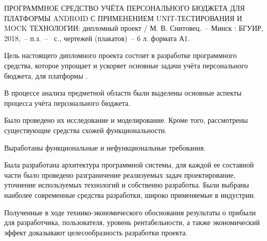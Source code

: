 \thispagestyle{empty}


\MakeUppercase{Программное средство учёта персонального бюджета для платформы Android с применением Unit-\-тес\-ти\-ро\-ва\-ния и Mock технологии}: дипломный проект / М. В. Снитовец.~-- Минск : БГУИР, 2018,~-- п.з.~-- \totalpages~с., чертежей (плакатов)~-- 6 л. формата А1.
\vspace{\baselineskip}

Цель настоящего дипломного проекта состоит в  разработке программного средства, которое упрощает и ускоряет основные задачи учёта персонального бюджета, для платформы \andro.

В процессе анализа предметной области были выделены основные аспекты процесса учёта персонального бюджета.

Было проведено их исследование и моделирование.
Кроме того, рассмотрены существующие средства схожей функциональности.

Выработаны функциональные и нефункциональные требования.

Была разработана архитектура программной системы, для каждой ее составной части было проведено разграничение реализуемых задач проектирование, уточнение используемых технологий и собственно разработка.
Были выбраны наиболее современные средства разработки, широко применяемые в индустрии.

Полученные в ходе технико-экономического обоснования результаты о прибыли для разработчика, пользователя, уровень рентабельности, а также экономический эффект доказывают целесообразность разработки про\-екта.
